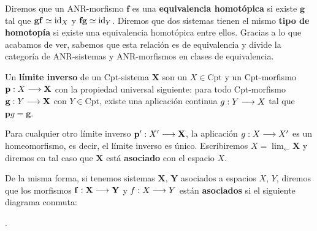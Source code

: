 Diremos que un ANR-morfismo $ \mathbf{f} $ es una \textbf{equivalencia homotópica} si existe $ \mathbf{g} $ tal que $ \mathbf{g}\mathbf{f}\simeq \operatorname{id}_X  $ y $ \mathbf{f}\mathbf{g}\simeq \operatorname{id}_Y  $. Diremos que dos sistemas tienen el mismo \textbf{tipo de homotopía} si existe una equivalencia homotópica entre ellos. Gracias a lo que acabamos de ver, sabemos que esta relación es de equivalencia y divide la categoría de ANR-sistemas y ANR-morfismos en clases de equivalencia. 

\begin{definition}
  Un \textbf{límite inverso} de un Cpt-sistema $ \mathbf{X} $ son un $ X \in \text{Cpt} $ y un Cpt-morfismo $ \mathbf{p}:X\longrightarrow \mathbf{X} $ con la propiedad universal siguiente: para todo Cpt-morfismo  $ \mathbf{g}:Y \longrightarrow \mathbf{X} $ con $ Y\in \text{Cpt} $, existe una aplicación continua $ g:Y\longrightarrow X  $ tal que $ \mathbf{p}g = \mathbf{g} $.
\end{definition}
\begin{observation}
  Para cualquier otro límite inverso $ \mathbf{p}':X'\longrightarrow \mathbf{X} $, la aplicación  $ g:X\longrightarrow X'  $ es un homeomorfismo, es decir, el límite inverso es único. Escribiremos $ X = \displaystyle\lim_{\longleftarrow}\mathbf{X}  $ y diremos en tal caso que $ \mathbf{X} $ está \textbf{asociado} con el espacio $ X  $.
\end{observation}

De la misma forma, si tenemos sistemas $ \mathbf{X} $, $ \mathbf{Y} $ asociados a espacios $ X $, $ Y$, diremos que los morfismos $ \mathbf{f}:\mathbf{X}\longrightarrow \mathbf{Y} $ y $ f:X\longrightarrow Y  $ están \textbf{asociados} si el siguiente diagrama conmuta:
\begin{center}
  .
\end{center}


